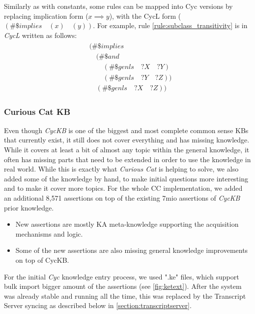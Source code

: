Similarly as with constants, some rules can be mapped into Cyc versions by 
replacing implication form ($x \implies y$), with the CycL form 
($(\#\$implies\quad (x) \quad (y))$. For example, rule 
\ref{rule:subclass_transitivity} is in \emph{CycL} written as follows:
\begin{equation}\label{as:cycrule}
\begin{gathered}
\begin{aligned}
&(\#\$implies\\
	&\quad(\#\$and\\
		&\qquad(\#\$genls\quad?X\quad?Y)\\
		&\qquad(\#\$genls\quad?Y\quad?Z))\\
	&\quad(\#\$genls\quad?X\quad?Z))
\end{aligned}
\end{gathered}
\end{equation}

\subsubsection{Curious Cat KB}
\label{section:cckb}
Even though \emph{CycKB} is one of the biggest and most complete common sense 
KBs that currently exist, it still does not cover everything and has missing 
knowledge. While it covers at least a bit of almost any topic within the general
knowledge, it often has missing parts that need to be extended in order to use
the knowledge in real world. While this is exactly what \emph{Curious Cat} is
helping to solve, we also added some of the knowledge by hand, to make initial
questions more interesting and to make it cover more topics. For the whole CC
implementation, we added an additional 8,571 assertions on top of the existing 
7mio assertions of \emph{CycKB} prior knowledge.
\begin{itemize}
\item New assertions are mostly KA meta-knowledge supporting the acquisition
mechanisms and logic.
\item Some of the new assertions are also missing general knowledge 
improvements on top of CycKB.
\end{itemize}

For the initial \emph{Cyc} knowledge entry process, we used ".ke" files, 
which support bulk import bigger amount of the assertions (see 
\autoref{fig:ketext}). After the system was already stable and running all the
time, this was replaced by the Transcript Server syncing as described below
in \autoref{section:transcriptserver}.

